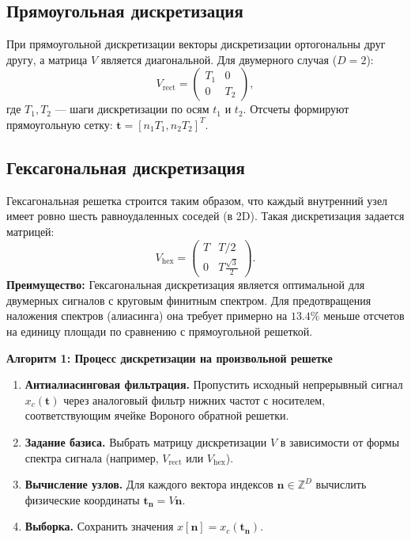 \documentclass[12pt, a4paper]{article}
\begin{document}
\subsection{Прямоугольная дискретизация}
При прямоугольной дискретизации векторы дискретизации ортогональны друг другу, а матрица $V$ является диагональной. Для двумерного случая ($D=2$):
\begin{equation}
    V_{\text{rect}} = \begin{pmatrix} T_1 & 0 \\ 0 & T_2 \end{pmatrix},
\end{equation}
где $T_1, T_2$ --- шаги дискретизации по осям $t_1$ и $t_2$. Отсчеты формируют прямоугольную сетку: $\mathbf{t} = [n_1 T_1, n_2 T_2]^T$.

\subsection{Гексагональная дискретизация}
Гексагональная решетка строится таким образом, что каждый внутренний узел имеет ровно шесть равноудаленных соседей (в 2D). Такая дискретизация задается матрицей:
\begin{equation}
    V_{\text{hex}} = \begin{pmatrix} T & T/2 \\ 0 & T\frac{\sqrt{3}}{2} \end{pmatrix}.
\end{equation}
\textbf{Преимущество:} Гексагональная дискретизация является оптимальной для двумерных сигналов с круговым финитным спектром. Для предотвращения наложения спектров (алиасинга) она требует примерно на $13.4\%$ меньше отсчетов на единицу площади по сравнению с прямоугольной решеткой.

\vspace{0.5cm}
\noindent\textbf{Алгоритм 1: Процесс дискретизации на произвольной решетке}
\begin{enumerate}
    \item \textbf{Антиалиасинговая фильтрация.} Пропустить исходный непрерывный сигнал $x_c(\mathbf{t})$ через аналоговый фильтр нижних частот с носителем, соответствующим ячейке Вороного обратной решетки.
    \item \textbf{Задание базиса.} Выбрать матрицу дискретизации $V$ в зависимости от формы спектра сигнала (например, $V_{\text{rect}}$ или $V_{\text{hex}}$).
    \item \textbf{Вычисление узлов.} Для каждого вектора индексов $\mathbf{n} \in \mathbb{Z}^D$ вычислить физические координаты $\mathbf{t}_{\mathbf{n}} = V\mathbf{n}$.
    \item \textbf{Выборка.} Сохранить значения $x[\mathbf{n}] = x_c(\mathbf{t}_{\mathbf{n}})$.
\end{enumerate}
\end{document}
